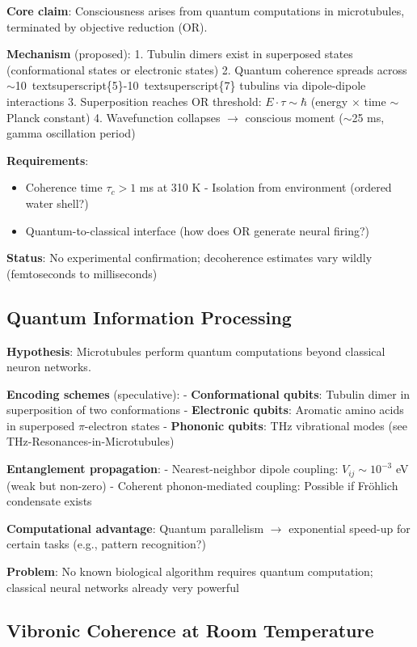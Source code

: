 \textbf{Core claim}: Consciousness arises from quantum computations in
microtubules, terminated by objective reduction (OR).

\textbf{Mechanism} (proposed): 1. Tubulin dimers exist in superposed
states (conformational states or electronic states) 2. Quantum coherence
spreads across
$\sim$10\ textsuperscript\{5\}-10\ textsuperscript\{7\}
tubulins via dipole-dipole interactions 3. Superposition reaches OR
threshold: \(E \cdot \tau \sim \hbar\) (energy $\times$
time $\sim${} Planck constant) 4. Wavefunction collapses
$\rightarrow$ conscious moment ($\sim$25 ms,
gamma oscillation period)

\textbf{Requirements}:
\begin{itemize}
\item Coherence time \(\tau_c > 1\) ms at 310 K -
Isolation from environment (ordered water shell?)
\item Quantum-to-classical
interface (how does OR generate neural firing?)
\end{itemize}


\textbf{Status}: No experimental confirmation; decoherence estimates
vary wildly (femtoseconds to milliseconds)

\subsection{Quantum Information
Processing}\label{quantum-information-processing}

\textbf{Hypothesis}: Microtubules perform quantum computations beyond
classical neuron networks.

\textbf{Encoding schemes} (speculative): - \textbf{Conformational
qubits}: Tubulin dimer in superposition of two conformations -
\textbf{Electronic qubits}: Aromatic amino acids in superposed
\(\pi\)-electron states - \textbf{Phononic qubits}: THz vibrational
modes (see THz-Resonances-in-Microtubules)

\textbf{Entanglement propagation}: - Nearest-neighbor dipole coupling:
\(V_{ij} \sim 10^{-3}\) eV (weak but non-zero) - Coherent
phonon-mediated coupling: Possible if Fröhlich condensate exists

\textbf{Computational advantage}: Quantum parallelism
$\rightarrow$ exponential speed-up for certain tasks
(e.g., pattern recognition?)

\textbf{Problem}: No known biological algorithm requires quantum
computation; classical neural networks already very powerful

\subsection{Vibronic Coherence at Room
Temperature}\label{vibronic-coherence-at-room-temperature}

